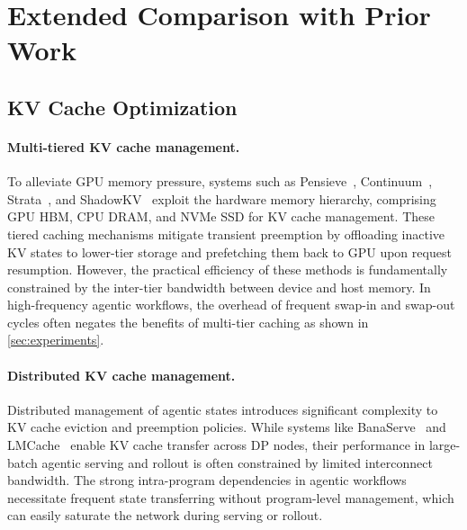 \section{Extended Comparison with Prior Work}
\subsection{KV Cache Optimization}
\label{appendx: kv opt}
\paragraph{Multi-tiered KV cache management.}
To alleviate GPU memory pressure, systems such as Pensieve~\citep{Yu_2025}, Continuum~\cite{li2025continuumefficientrobustmultiturn}, Strata~\citep{xie2025stratahierarchicalcontextcaching}, and ShadowKV~\citep{sun2025shadowkvkvcacheshadows} exploit the hardware memory hierarchy, comprising GPU HBM, CPU DRAM, and NVMe SSD for KV cache management. These tiered caching mechanisms mitigate transient preemption by offloading inactive KV states to lower-tier storage and prefetching them back to GPU upon request resumption. However, the practical efficiency of these methods is fundamentally constrained by the inter-tier bandwidth between device and host memory. In high-frequency agentic workflows, the overhead of frequent swap-in and swap-out cycles often negates the benefits of multi-tier caching as shown in \autoref{sec:experiments}.



\paragraph{Distributed KV cache management.}
Distributed management of agentic states introduces significant complexity to KV cache eviction and preemption policies. While systems like BanaServe~\citep{he2025banaserveunifiedkvcache} and LMCache~\citep{liu2025lmcacheefficientkvcache} enable KV cache transfer across DP nodes, their performance in large-batch agentic serving and rollout is often constrained by limited interconnect bandwidth. The strong intra-program dependencies in agentic workflows necessitate frequent state transferring without program-level management, which can easily saturate the network during serving or rollout.


